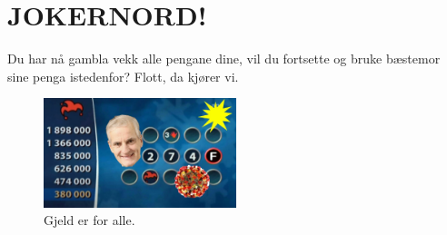 \chapter{JOKERNORD!}
\thispagestyle{fancy}
Du har nå gambla vekk alle pengane dine, vil du fortsette og bruke bæstemor sine penga istedenfor?
Flott, da kjører vi.

\begin{figure}[htbp]
    \centering
    \includegraphics[width=0.5\textwidth]{Bilder/JokerNord.jpg}
    \caption{Gjeld er for alle.}
    \label{fig:JokerNord}
\end{figure}
    